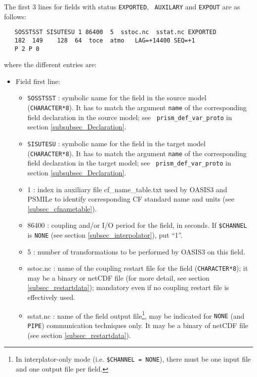   The first 3 lines for fields with status {\tt EXPORTED}, {\tt
  AUXILARY} and {\tt EXPOUT} are as follows:
  \begin{verbatim}
   SOSSTSST SISUTESU 1 86400  5  sstoc.nc  sstat.nc EXPORTED
   182  149    128  64  toce  atmo   LAG=+14400 SEQ=+1
   P 2 P 0 
  \end{verbatim}
  where the different entries are:
    \begin{itemize}
      \item Field first line:
        \begin{itemize}
        \item {\tt SOSSTSST} : symbolic name for the field in the
              source model ({\tt CHARACTER*8}). It has to match the
              argument {\tt name} of the corresponding field
              declaration in the source model; see {\tt
              prism\_def\_var\_proto} in section
              \ref{subsubsec_Declaration}.
        \item {\tt SISUTESU} : symbolic name for the field in the
              target model ({\tt CHARACTER*8}).  It has to match the
              argument {\tt name} of the corresponding field
              declaration in the target model; see {\tt
              prism\_def\_var\_proto} in section
              \ref{subsubsec_Declaration}.
        \item 1 : index in auxiliary file cf\_name\_table.txt used by OASIS3 and PSMILe to identify corresponding CF standard name and units (see \ref{subsec_cfnametable}).
        \item 86400 : coupling and/or I/O period for the field, in
        seconds. If {\tt \$CHANNEL} is {\tt NONE} (see section
\ref{subsec_interpolator}), put ``1''.
        \item 5 : number of transformations to be performed by OASIS3 on this field.  
        \item sstoc.nc : name of the coupling restart file for the
          field ({\tt CHARACTER*8}); it may be a binary or netCDF file
          (for more detail, see section \ref{subsec_restartdata});
          mandatory even if no coupling restart file is effectively
          used.
        \item sstat.nc : name of the field output file\footnote{In interplator-only mode (i.e. {\tt \$CHANNEL = NONE}), there must be one input file and one output file per field.}, may be indicated for
	  {\tt NONE} (and {\tt PIPE}) communication techniques only. It
	  may be a binary of netCDF file (see section
	  \ref{subsec_restartdata}).

\end{itemize}
\end{itemize}
